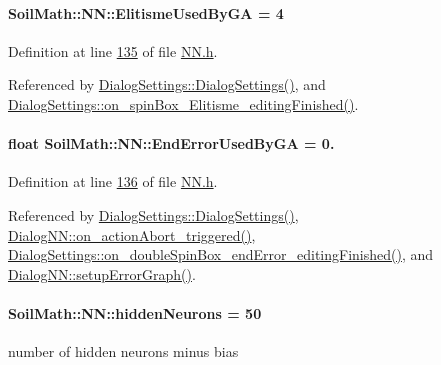 \paragraph[{Elitisme\+Used\+By\+G\+A}]{ Soil\+Math\+::\+N\+N\+::\+Elitisme\+Used\+By\+G\+A = 4}\label{class_soil_math_1_1_n_n_aee7f8d1feb35f3230c10894dacf69740}


Definition at line \hyperlink{_n_n_8h_source_l00135}{135} of file \hyperlink{_n_n_8h_source}{N\+N.\+h}.



Referenced by \hyperlink{dialogsettings_8cpp_source_l00005}{Dialog\+Settings\+::\+Dialog\+Settings()}, and \hyperlink{dialogsettings_8cpp_source_l00433}{Dialog\+Settings\+::on\+\_\+spin\+Box\+\_\+\+Elitisme\+\_\+editing\+Finished()}.

\hypertarget{class_soil_math_1_1_n_n_aa29b48e0711848633d5cdbb22055910d}{}
\paragraph[{End\+Error\+Used\+By\+G\+A}]{\setlength{\rightskip}{0pt plus 5cm}float Soil\+Math\+::\+N\+N\+::\+End\+Error\+Used\+By\+G\+A = 0.}\label{class_soil_math_1_1_n_n_aa29b48e0711848633d5cdbb22055910d}


Definition at line \hyperlink{_n_n_8h_source_l00136}{136} of file \hyperlink{_n_n_8h_source}{N\+N.\+h}.



Referenced by \hyperlink{dialogsettings_8cpp_source_l00005}{Dialog\+Settings\+::\+Dialog\+Settings()}, \hyperlink{dialognn_8cpp_source_l00147}{Dialog\+N\+N\+::on\+\_\+action\+Abort\+\_\+triggered()}, \hyperlink{dialogsettings_8cpp_source_l00437}{Dialog\+Settings\+::on\+\_\+double\+Spin\+Box\+\_\+end\+Error\+\_\+editing\+Finished()}, and \hyperlink{dialognn_8cpp_source_l00058}{Dialog\+N\+N\+::setup\+Error\+Graph()}.

\hypertarget{class_soil_math_1_1_n_n_aedf4b2ddaae281d83e666c308e5d67c4}{}
\paragraph[{hidden\+Neurons}]{ Soil\+Math\+::\+N\+N\+::hidden\+Neurons = 50\hspace{0.3cm}{\ttfamily [private]}}\label{class_soil_math_1_1_n_n_aedf4b2ddaae281d83e666c308e5d67c4}
number of hidden neurons minus bias 

